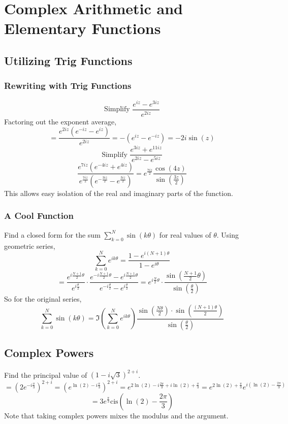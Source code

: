 \documentclass[../main.tex]{subfiles}
\begin{document}
\chapter{Complex Arithmetic and Elementary Functions}
\section{Utilizing Trig Functions}
    \subsection{Rewriting with Trig Functions}
        $$\text{Simplify } \frac{e^{iz}-e^{3iz}}{e^{2iz}}$$
        Factoring out the exponent average,
        $$=\frac{e^{2iz}(e^{-iz}-e^{iz})}{e^{2iz}}=-(e^{iz}-e^{-iz})=-2i\sin(z)$$
        $$\text{Simplify } \frac{e^{3iz}+e^{11iz}}{e^{2iz}-e^{5iz}}$$
        $$\frac{e^{7iz}(e^{-4iz}+e^{4iz})}{e^{\frac{7iz}{2}}(e^{-\frac{3iz}{2}}-e^{\frac{3iz}{2}})}=e^{\frac{7iz}{2}}\frac{\cos(4z)}{\sin(\frac{3z}{2})}$$
        This allows easy isolation of the real and imaginary parts of the function.

    \subsection{A Cool Function}
        Find a closed form for the sum $\sum_{k=0}^{N}\sin(k\theta)$ for real values of $\theta$.
        Using geometric series,
        $$\sum_{k=0}^{N}e^{ik\theta}=\frac{1-e^{i(N+1)\theta}}{1-e^{i\theta}}$$
        $$=\frac{e^{i\frac{N+1}{2}\theta}}{e^{i\frac{\theta}{2}}}\cdot\frac{e^{-i\frac{N+1}{2}\theta}-e^{i\frac{N+1}{2}\theta}}{e^{-i\frac{\theta}{2}}-e^{i\frac{\theta}{2}}}=e^{i\frac{N}{2}\theta}\cdot\frac{\sin(\frac{N+1}{2}\theta)}{\sin(\frac{\theta}{2})}$$
        So for the original series,
        $$\sum_{k=0}^{N}\sin(k\theta)=\Im(\sum_{k=0}^{N}e^{ik\theta})\frac{\sin(\frac{N\theta}{2})\cdot\sin(\frac{(N+1)\theta}{2})}{\sin(\frac{\theta}{2})}$$

\section{Complex Powers}
    Find the principal value of $(1-i\sqrt{3})^{2+i}$.
    $$=(2e^{-i\frac{\pi}{3}})^{2+i}=(e^{\ln(2)-i\frac{\pi}{3}})^{2+i}=e^{2\ln(2)-i\frac{2\pi}{3}+i\ln(2)+\frac{\pi}{3}}=e^{2\ln(2)+\frac{\pi}{3}}e^{i(\ln(2)-\frac{2\pi}{3})}$$
    $$=3e^{\frac{\pi}{3}}\text{cis}(\ln(2)-\frac{2\pi}{3})$$
    Note that taking complex powers mixes the modulus and the argument.
\end{document}
